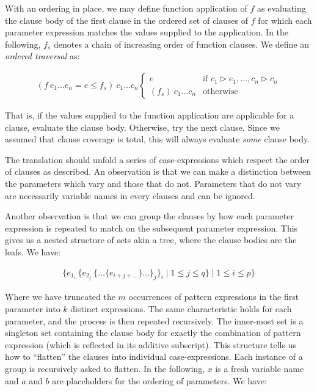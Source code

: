 With an ordering in place, we may define function application of $f$ as
evaluating the clause body of the first clause in the ordered set of clauses of
$f$ for which each parameter expression matches the values supplied to the
application. In the following, $f_s$ denotes a chain of increasing order of
function clauses. We define an \emph{ordered traversal} as:

\begin{align*}
  (f~e_1 \dots e_n = e \le f_s)~c_1 \dots c_n
  \begin{cases}
    e & \text{if $c_1 \rhd e_1, \dots, c_n \rhd c_n$}  \\
    (f_s)~c_1 \dots c_n & \text{otherwise}
  \end{cases}
\end{align*}

That is, if the values supplied to the function application are applicable for
a clause, evaluate the clause body. Otherwise, try the next clause. Since we
assumed that clause coverage is total, this will always evaluate \emph{some}
clause body.

The translation should unfold a series of case-expressions which respect the
order of clauses as described. An observation is that we can make a distinction
between the parameters which vary and those that do not. Parameters that do not
vary are necessarily variable names in every clauses and can be ignored.

Another observation is that we can group the clauses by how each parameter
expression is repeated to match on the subsequent parameter expression. This
gives us a nested structure of sets akin a tree, where the clause bodies are
the leafs. We have:

\begin{align*}
  \{ e_{1_i}~\{ e_{2_j}~\{ \dots \{ e_{i + j + \dots} \} \dots \}_j \}_i \mid 1 \le j \le q \} \mid 1 \le i \le p \}
\end{align*}

Where we have truncated the $m$ occurrences of pattern expressions in the first
parameter into $k$ distinct expressions. The same characteristic holds for each
parameter, and the process is then repeated recursively. The inner-most set is
a singleton set containing the clause body for exactly the combination of
pattern expression (which is reflected in its additive subscript). This
structure tells us how to ``flatten'' the clauses into individual
case-expressions.  Each instance of a group is recursively asked to flatten. In
the following, $x$ is a fresh variable name and $a$ and $b$ are placeholders
for the ordering of parameters. We have:

